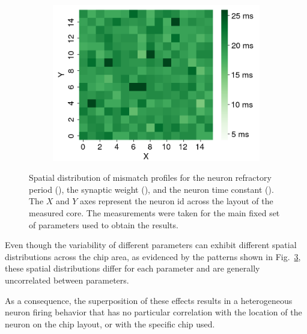\begin{figure}[h]
\begin{subfigure}{.32\textwidth}
    \subcaption{}
    \label{fig:wgt_spatial_dist}
  \end{subfigure}
    \begin{subfigure}{.32\textwidth}
    \centering
    \includegraphics[width=\textwidth]{img/chapter4/tau1_spatial_distribution.png}
    \subcaption{}
    \label{fig:tau1_spatial_dist}
  \end{subfigure}
  \caption[Spatial distribution of mismatch profiles for the neuron and synapse parameters]{Spatial distribution of mismatch profiles for the neuron refractory period (), the synaptic weight (), and the neuron time constant (). The $X$ and $Y$ axes represent the neuron id across the layout of the measured core. The measurements were taken for the main fixed set of parameters used to obtain the results.}
  \label{fig:core_spatial_mismatch}
\end{figure}

Even though the variability of different parameters can exhibit different spatial distributions across the chip area, as evidenced by the patterns shown in Fig.~\ref{fig:core_spatial_mismatch}, these spatial distributions differ for each parameter and are generally uncorrelated between parameters.


As a consequence, the superposition of these effects results in a heterogeneous neuron firing behavior that has no particular correlation with the location of the neuron on the chip layout, or with the specific chip used.

